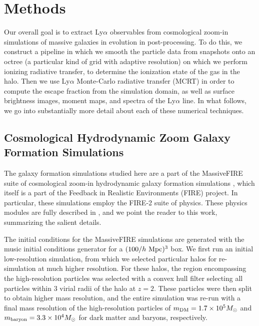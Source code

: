 \chapter{Methods}
\label{sec:methods}

Our overall goal is to extract Ly$\alpha$ observables from cosmological zoom-in simulations of massive galaxies in evolution in post-processing.
To do this, we construct a pipeline in which we smooth the particle data from snapshots onto an octree (a particular kind of grid with adaptive resolution) on which we perform ionizing radiative transfer, to determine the ionization state of the gas in the halo.
Then we use Ly$\alpha$ Monte-Carlo radiative transfer (MCRT) in order to compute the escape fraction from the simulation domain, as well as surface brightness images, moment maps, and spectra of the Ly$\alpha$ line.
In what follows, we go into substantially more detail about each of these numerical techniques.

\section{Cosmological Hydrodynamic Zoom Galaxy Formation Simulations}

The galaxy formation simulations studied here are a part of the MassiveFIRE suite of cosmological zoom-in hydrodynamic galaxy formation simulations \citep{Feldmann2016, Feldmann2017}, which itself is a part of the Feedback in Realistic Environments (FIRE) project.
In particular, these simulations employ the FIRE-2 suite of physics.
These physics modules are fully described in \citet{Hopkins2018}, and we point the reader to this work, summarizing the salient details.

The initial conditions for the MassiveFIRE simulations are generated with the {\sc music} initial conditions generator for a $(100/h \ {\rm Mpc})^3$ box.
We first run an initial low-resolution simulation, from which we selected particular halos for re-simulation at much higher resolution.
For these halos, the region encompassing the high-resolution particles was selected with a convex hull filter selecting all particles within $3$ virial radii of the halo at $z=2.$
These particles were then split to obtain higher mass resolution, and the entire simulation was re-run with a final mass resolution of the high-resolution particles of $m_{\rm DM} = 1.7 \times 10^5 M_\odot$ and $m_{\rm baryon} = 3.3 \times 10^4 M_\odot$ for dark matter and baryons, respectively.

